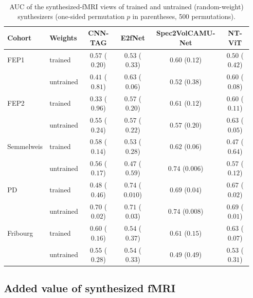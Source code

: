 \documentclass[pdflatex,referee,sn-basic]{sn-jnl}%
\begin{document}
\begin{table}[!htbp]
    \centering
    \caption{AUC of the synthesized-fMRI views of trained and untrained (random-weight) synthesizers (one-sided permutation $p$ in parentheses, 500 permutations).}
    \label{tab:clf}
    \footnotesize\setlength{\tabcolsep}{3pt}
    \begin{tabular}{@{}l l c c c c@{}}
        \hline
        Cohort & Weights & CNN-TAG & E2fNet & Spec2VolCAMU-Net & NT-ViT \\
        \hline
        FEP1 & trained & $0.57$ ($0.20$) & $0.53$ ($0.33$) & $0.60$ ($0.12$) & $0.50$ ($0.42$) \\
         & untrained & $0.41$ ($0.81$) & $0.63$ ($0.06$) & $0.52$ ($0.38$) & $0.60$ ($0.08$) \\
        FEP2 & trained & $0.33$ ($0.96$) & $0.57$ ($0.20$) & $0.61$ ($0.12$) & $0.60$ ($0.11$) \\
         & untrained & $0.55$ ($0.24$) & $0.57$ ($0.22$) & $0.57$ ($0.20$) & $0.63$ ($0.05$) \\
        Semmelweis & trained & $0.58$ ($0.14$) & $0.53$ ($0.28$) & $0.62$ ($0.06$) & $0.47$ ($0.64$) \\
         & untrained & $0.56$ ($0.17$) & $0.47$ ($0.59$) & $0.74$ ($0.006$) & $0.57$ ($0.12$) \\
        PD & trained & $0.48$ ($0.46$) & $0.74$ ($0.010$) & $0.69$ ($0.04$) & $0.67$ ($0.02$) \\
         & untrained & $0.70$ ($0.02$) & $0.71$ ($0.03$) & $0.74$ ($0.008$) & $0.69$ ($0.01$) \\
        Fribourg & trained & $0.60$ ($0.16$) & $0.54$ ($0.37$) & $0.61$ ($0.15$) & $0.63$ ($0.07$) \\
         & untrained & $0.55$ ($0.28$) & $0.54$ ($0.33$) & $0.49$ ($0.49$) & $0.53$ ($0.31$) \\
        \hline
    \end{tabular}
\end{table}

\subsection{Added value of synthesized fMRI}\label{section:res_delta}
\end{document}
